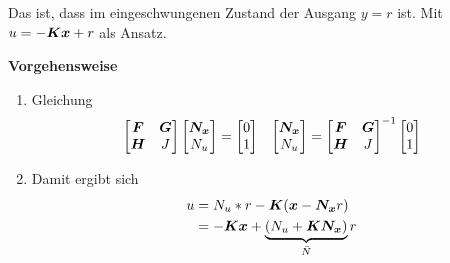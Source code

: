 \begin{tcolorbox}[colback=white!10!white,colframe=green!30!black,title=Referenzsystem] 
Das ist, dass im eingeschwungenen Zustand der Ausgang $y = r$ ist. Mit $u = -\boldsymbol{Kx}+r$ als Ansatz.

\tcblower
\textbf{Vorgehensweise}
\begin{enumerate}
	\item Gleichung \begin{align*}
		\begin{bmatrix}
		\boldsymbol{F} &\boldsymbol{G}\\ \boldsymbol{H} & J
		\end{bmatrix}\begin{bmatrix}
		\boldsymbol{N_x}\\N_u
		\end{bmatrix} = \begin{bmatrix}
			0\\1
		\end{bmatrix} && \begin{bmatrix}
		\boldsymbol{N_x}\\N_u
		\end{bmatrix} = 
		\begin{bmatrix}
		\boldsymbol{F} &\boldsymbol{G}\\ \boldsymbol{H} & J
		\end{bmatrix}^{-1} \begin{bmatrix}
		0\\1
		\end{bmatrix}
	\end{align*}
	\item Damit ergibt sich \begin{align*}
	u &= N_u  *r-\boldsymbol{K}(\boldsymbol{x}-\boldsymbol{N_x}r)\\
	&= -\boldsymbol{Kx}+\underbrace{(N_u+\boldsymbol{KN_x})}_{\bar{N}}r
	\end{align*}
\end{enumerate}



	
\end{tcolorbox}
\columnbreak